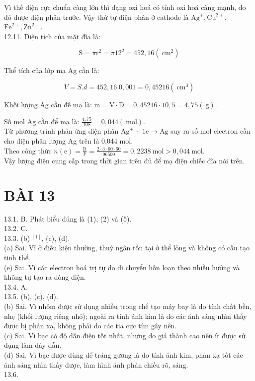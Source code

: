 \documentclass[10pt]{article}
\begin{document}
Vì thế điện cực chuẩn càng lớn thì dạng oxi hoá có tính oxi hoá càng mạnh, do đó được điện phân trước. Vậy thứ tự điện phân ở cathode là $\mathrm{Ag}^{+}, \mathrm{Cu}^{2+}$, $\mathrm{Fe}^{2+}, \mathrm{Zn}^{2+}$.\\
12.11. Diện tích của mặt đĩa là:

$$
\mathrm{S}=\pi \mathrm{r}^{2}=\pi 12^{2}=452,16\left(\mathrm{~cm}^{2}\right)
$$

Thể tích của lớp mạ Ag cần là:

$$
V=S . d=452,16.0,001=0,45216\left(\mathrm{~cm}^{3}\right)
$$

Khối lượng Ag cần đê̂ mạ là: $\mathrm{m}=\mathrm{V} \cdot \mathrm{D}=0,45216 \cdot 10,5=4,75(\mathrm{~g})$.

Số mol Ag cần để mạ là: $\frac{4,75}{108}=0,044(\mathrm{~mol})$.\\
Từ phương trình phản ứng điện phân $\mathrm{Ag}^{+}+1 \mathrm{e} \rightarrow \mathrm{Ag}$ suy ra số mol electron cần cho điện phân lượng Ag trên là 0,044 mol.\\
Theo công thức $n(\mathrm{e})=\frac{\mathrm{It}}{\mathrm{F}}=\frac{2 \cdot 3 \cdot 60 \cdot 60}{96500}=0,2238 \mathrm{~mol}>0,044 \mathrm{~mol}$.\\
Vậy lượng điện cung cấp trong thời gian trên đủ để mạ điện chiếc đĩa nói trên.

\section*{BÀI 13}
13.1. B. Phát biểu đúng là (1), (2) và (5).\\
13.2. C.\\
13.3. (b) ${ }^{[1]}$, (c), (d).\\
(a) Sai. Vỉ ở điều kiện thường, thuỷ ngân tồn tại ở thể lỏng và không có cấu tạo tinh thể.\\
(e) Sai. Vì các electron hoá trị tự do di chuyển hỗn loạn theo nhiều hướng và không tự tạo ra dòng điện.\\
13.4. A.\\
13.5. (b), (c), (d).\\
(b) Sai. Vì nhôm được sử dụng nhiều trong chế tạo máy bay là do tính chất bền, nhẹ (khối lượng riêng nhỏ); ngoài ra tính ánh kim là do các ánh sáng nhìn thấy được bị phản xạ, không phải do các tia cực tím gây nên.\\
(c) Sai. Vì bạc có độ dẫn điện tốt nhất, nhưng do giá thành cao nên ít được sử dụng làm dây dẫn.\\
(d) Sai. Vì bạc được dùng để tráng gương là do tính ánh kim, phản xạ tốt các ánh sáng nhìn thấy được, làm hình ảnh phản chiếu rõ, sáng.\\
13.6.
\end{document}
